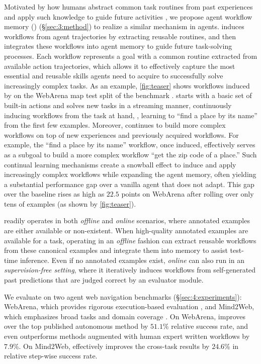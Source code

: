 Motivated by how humans abstract common task routines from past experiences and apply such knowledge to guide future activities \citep{chi1981categorization,chi2014nature}, we propose agent workflow memory (\awm) (\S\ref{sec:3:method}) to realize a similar mechanism in agents. \awm induces workflows from agent trajectories by extracting reusable routines, and then integrates these workflows into agent memory to guide future task-solving processes. Each workflow represents a goal with a common routine extracted from available action trajectories, which allows it to effectively capture the most essential and reusable skills agents need to acquire to successfully solve increasingly complex tasks.
%
As an example, \autoref{fig:teaser} shows workflows induced by \awm on the WebArena map test split of the  benchmark \citep{zhou2024webarena}.
\awm starts with a basic set of built-in actions and solves new tasks in a streaming manner, continuously inducing workflows from the task at hand, \eg, learning to ``find a place by its name'' from the first few examples. Moreover, \awm continues to build more complex workflows on top of new experiences and previously acquired workflows. 
For example, the  ``find a place by its name'' workflow, once induced, effectively serves as a subgoal to build a more complex workflow ``get the zip code of a place.'' 
%
Such continual learning mechanisms create a snowball effect to induce and apply increasingly complex workflows while expanding the agent memory, often yielding a substantial performance gap over a vanilla agent that does not adapt. This gap over the baseline rises as high as $22.5$ points on WebArena after rolling over only tens of examples (as shown by \autoref{fig:teaser}).

\awm readily operates in both \textit{offline} and \textit{online} scenarios, where annotated examples are either available or non-existent. When high-quality annotated examples are available for a task, \awm operating in an \textit{offline} fashion can extract reusable workflows from these canonical examples and integrate them into memory to assist test-time inference. Even if no annotated examples exist, \awm \textit{online} can also run in an \textit{supervision-free setting}, where it iteratively induces workflows from self-generated past predictions that are judged correct by an evaluator module.


We evaluate \awm on two agent web navigation benchmarks (\S\ref{sec:4:experiments}): WebArena, which provides rigorous execution-based evaluation \citep{zhou2024webarena}, and Mind2Web, which emphasizes broad tasks and domain coverage \citep{deng2023mindweb}.
On WebArena, \awm improves over the top published autonomous method \citep{drouin2024workarena} by $51.1$\% relative success rate, and even outperforms methods augmented with human expert written workflows \citep{sodhi2023heap} by $7.9$\%.
On Mind2Web, \awm effectively improves the cross-task results by $24.6$\% in relative step-wise success rate. 

